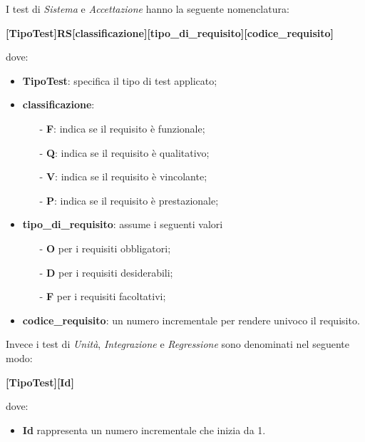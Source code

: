 I test di \textit{Sistema} e \textit{Accettazione} hanno la seguente nomenclatura:
\begin{center}
	\textbf{[TipoTest]RS[classificazione][tipo\_di\_requisito][codice\_requisito]}
\end{center}
dove:
\begin{itemize}
	\item \textbf{TipoTest}: specifica il tipo di test applicato;
	\item \textbf{classificazione}:
	\begin{itemize}
		\item[-] \textbf{F}: indica se il requisito è funzionale;
		\item[-] \textbf{Q}: indica se il requisito è qualitativo;
		\item[-] \textbf{V}: indica se il requisito è vincolante;
		\item[-] \textbf{P}: indica se il requisito è prestazionale;
	\end{itemize}
	\item \textbf{tipo\_di\_requisito}: assume i seguenti valori
		\begin{itemize}
			\item[-] \textbf{O} per i requisiti obbligatori;
			\item[-] \textbf{D} per i requisiti desiderabili;
			\item[-] \textbf{F} per i requisiti facoltativi;
		\end{itemize}
	\item \textbf{codice\_requisito}: un numero incrementale per rendere univoco il requisito.
\end{itemize}

Invece i test di \textit{Unità}, \textit{Integrazione} e \textit{Regressione} sono denominati nel seguente modo:
\begin{center}
	\textbf{[TipoTest][Id]}
\end{center}
dove:
\begin{itemize}
	\item \textbf{Id} rappresenta un numero incrementale che inizia da 1.
\end{itemize}

